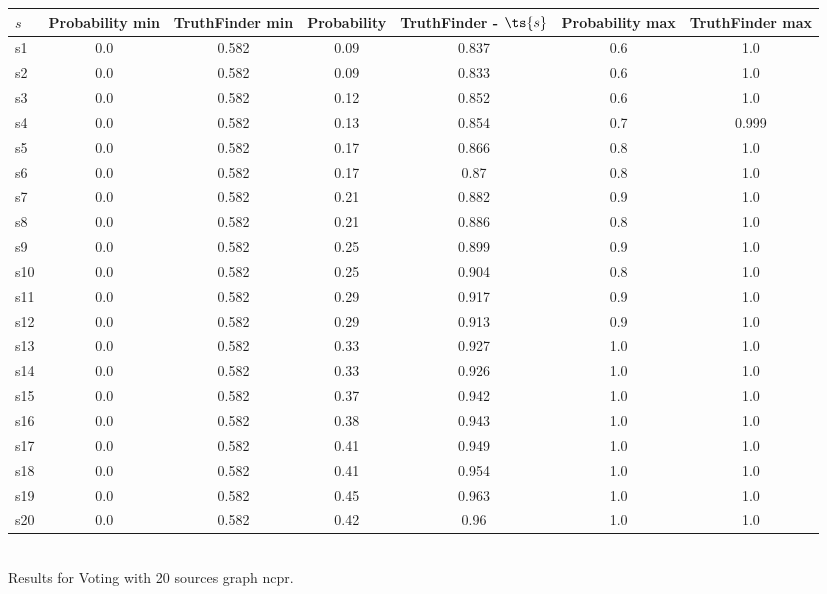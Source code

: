 \documentclass{article}
\begin{document}
\noindent\begin{tabular}{|l|c|c|c|c|c|c|}
\hline
$s$& Probability min & TruthFinder min & Probability & TruthFinder - $\ts{s}$ & Probability max & TruthFinder max\\
\hline
s1 &0.0 & 0.582 & 0.09 & 0.837 & 0.6 & 1.0\\
\hline
s2 &0.0 & 0.582 & 0.09 & 0.833 & 0.6 & 1.0\\
\hline
s3 &0.0 & 0.582 & 0.12 & 0.852 & 0.6 & 1.0\\
\hline
s4 &0.0 & 0.582 & 0.13 & 0.854 & 0.7 & 0.999\\
\hline
s5 &0.0 & 0.582 & 0.17 & 0.866 & 0.8 & 1.0\\
\hline
s6 &0.0 & 0.582 & 0.17 & 0.87 & 0.8 & 1.0\\
\hline
s7 &0.0 & 0.582 & 0.21 & 0.882 & 0.9 & 1.0\\
\hline
s8 &0.0 & 0.582 & 0.21 & 0.886 & 0.8 & 1.0\\
\hline
s9 &0.0 & 0.582 & 0.25 & 0.899 & 0.9 & 1.0\\
\hline
s10 &0.0 & 0.582 & 0.25 & 0.904 & 0.8 & 1.0\\
\hline
s11 &0.0 & 0.582 & 0.29 & 0.917 & 0.9 & 1.0\\
\hline
s12 &0.0 & 0.582 & 0.29 & 0.913 & 0.9 & 1.0\\
\hline
s13 &0.0 & 0.582 & 0.33 & 0.927 & 1.0 & 1.0\\
\hline
s14 &0.0 & 0.582 & 0.33 & 0.926 & 1.0 & 1.0\\
\hline
s15 &0.0 & 0.582 & 0.37 & 0.942 & 1.0 & 1.0\\
\hline
s16 &0.0 & 0.582 & 0.38 & 0.943 & 1.0 & 1.0\\
\hline
s17 &0.0 & 0.582 & 0.41 & 0.949 & 1.0 & 1.0\\
\hline
s18 &0.0 & 0.582 & 0.41 & 0.954 & 1.0 & 1.0\\
\hline
s19 &0.0 & 0.582 & 0.45 & 0.963 & 1.0 & 1.0\\
\hline
s20 &0.0 & 0.582 & 0.42 & 0.96 & 1.0 & 1.0\\
\hline
\end{tabular}\\

\noindent Results for Voting with 20 sources graph ncpr.
\end{document}
